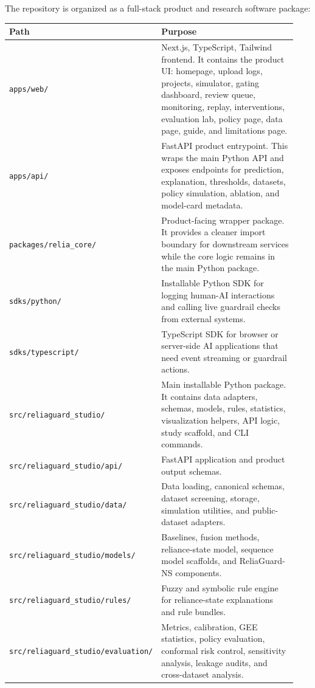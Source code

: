 \documentclass[11pt]{article}
\newcommand{\model}{ReliaGuard-NS}
\newcommand{\codepath}[1]{\nolinkurl{#1}}
\begin{document}
The repository is organized as a full-stack product and research software package:

\begin{longtable}{p{0.28\linewidth} p{0.66\linewidth}}
\toprule
\textbf{Path} & \textbf{Purpose} \\
\midrule
\codepath{apps/web/} & Next.js, TypeScript, Tailwind frontend. It contains the product UI: homepage, upload logs, projects, simulator, gating dashboard, review queue, monitoring, replay, interventions, evaluation lab, policy page, data page, guide, and limitations page. \\
\codepath{apps/api/} & FastAPI product entrypoint. This wraps the main Python API and exposes endpoints for prediction, explanation, thresholds, datasets, policy simulation, ablation, and model-card metadata. \\
\codepath{packages/relia\_core/} & Product-facing wrapper package. It provides a cleaner import boundary for downstream services while the core logic remains in the main Python package. \\
\codepath{sdks/python/} & Installable Python SDK for logging human-AI interactions and calling live guardrail checks from external systems. \\
\codepath{sdks/typescript/} & TypeScript SDK for browser or server-side AI applications that need event streaming or guardrail actions. \\
\codepath{src/reliaguard\_studio/} & Main installable Python package. It contains data adapters, schemas, models, rules, statistics, visualization helpers, API logic, study scaffold, and CLI commands. \\
\codepath{src/reliaguard\_studio/api/} & FastAPI application and product output schemas. \\
\codepath{src/reliaguard\_studio/data/} & Data loading, canonical schemas, dataset screening, storage, simulation utilities, and public-dataset adapters. \\
\codepath{src/reliaguard\_studio/models/} & Baselines, fusion methods, reliance-state model, sequence model scaffolds, and \model{} components. \\
\codepath{src/reliaguard\_studio/rules/} & Fuzzy and symbolic rule engine for reliance-state explanations and rule bundles. \\
\codepath{src/reliaguard\_studio/evaluation/} & Metrics, calibration, GEE statistics, policy evaluation, conformal risk control, sensitivity analysis, leakage audits, and cross-dataset analysis. \\

\end{longtable}
\end{document}
